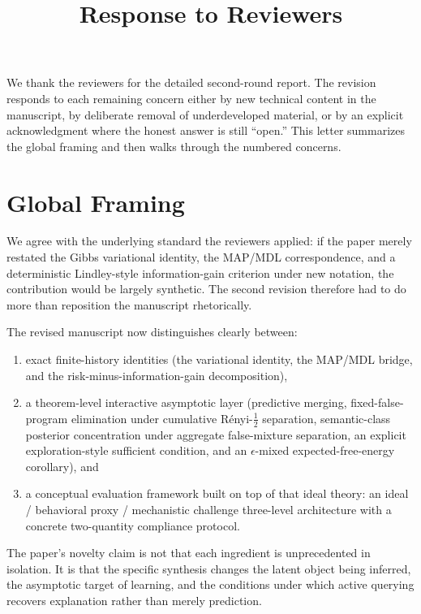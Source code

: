 \documentclass[11pt]{article}
\title{Response to Reviewers}
\author{}
\date{}
\begin{document}
\maketitle

We thank the reviewers for the detailed second-round report. The revision responds to each remaining concern either by new technical content in the manuscript, by deliberate removal of underdeveloped material, or by an explicit acknowledgment where the honest answer is still ``open.'' This letter summarizes the global framing and then walks through the numbered concerns.

\section*{Global Framing}

We agree with the underlying standard the reviewers applied: if the paper merely restated the Gibbs variational identity, the MAP/MDL correspondence, and a deterministic Lindley-style information-gain criterion under new notation, the contribution would be largely synthetic. The second revision therefore had to do more than reposition the manuscript rhetorically.

The revised manuscript now distinguishes clearly between:
\begin{enumerate}
\item exact finite-history identities (the variational identity, the MAP/MDL bridge, and the risk-minus-information-gain decomposition),
\item a theorem-level interactive asymptotic layer (predictive merging, fixed-false-program elimination under cumulative R\'enyi-$\tfrac12$ separation, semantic-class posterior concentration under aggregate false-mixture separation, an explicit exploration-style sufficient condition, and an $\epsilon$-mixed expected-free-energy corollary), and
\item a conceptual evaluation framework built on top of that ideal theory: an ideal / behavioral proxy / mechanistic challenge three-level architecture with a concrete two-quantity compliance protocol.
\end{enumerate}

The paper's novelty claim is not that each ingredient is unprecedented in isolation. It is that the specific synthesis changes the latent object being inferred, the asymptotic target of learning, and the conditions under which active querying recovers explanation rather than merely prediction.
\end{document}
